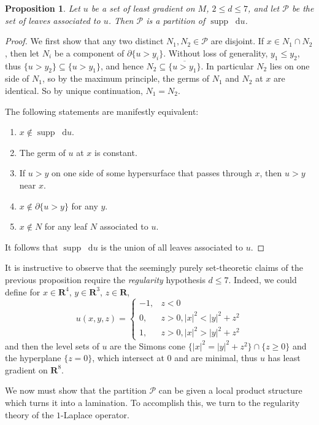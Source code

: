 \documentclass[reqno,10pt]{amsart}
\newcommand{\RR}{\mathbf{R}}
\DeclareMathOperator{\supp}{supp}
\newcommand*\dif{\mathop{}\!\mathrm{d}}
\newtheorem{proposition}[theorem]{Proposition}
\theoremstyle{definition}
\numberwithin{equation}{section}
\begin{document}
\begin{proposition}
Let $u$ be a set of least gradient on $M$, $2 \leq d \leq 7$, and let $\mathscr P$ be the set of leaves associated to $u$.
Then $\mathscr P$ is a partition of $\supp \dif u$.
\end{proposition}
\begin{proof}
We first show that any two distinct $N_1, N_2 \in \mathscr P$ are disjoint.
If $x \in N_1 \cap N_2$, then let $N_i$ be a component of $\partial \{u > y_i\}$.
Without loss of generality, $y_1 \leq y_2$, thus $\{u > y_2\} \subseteq \{u > y_1\}$, and hence $N_2 \subseteq \overline{\{u > y_1\}}$.
In particular $N_2$ lies on one side of $N_1$, so by the maximum principle, the germs of $N_1$ and $N_2$ at $x$ are identical.
So by unique continuation, $N_1 = N_2$.

The following statements are manifestly equivalent:
\begin{enumerate}
\item $x \notin \supp \dif u$.
\item The germ of $u$ at $x$ is constant.
\item If $u > y$ on one side of some hypersurface that passes through $x$, then $u > y$ near $x$.
\item $x \notin \partial \{u > y\}$ for any $y$.
\item $x \notin N$ for any leaf $N$ associated to $u$.
\end{enumerate}
It follows that $\supp \dif u$ is the union of all leaves associated to $u$.
\end{proof}

It is instructive to observe that the seemingly purely set-theoretic claims of the previous proposition require the \emph{regularity} hypothesis $d \leq 7$.
Indeed, we could define for $x \in \RR^4$, $y \in \RR^3$, $z \in \RR$,
$$u(x, y, z) = \begin{cases}
-1, & z < 0 \\
0, & z > 0, |x|^2 < |y|^2 + z^2 \\
1, & z > 0, |x|^2 > |y|^2 + z^2
\end{cases}$$
and then the level sets of $u$ are the Simons cone $\{|x|^2 = |y|^2 + z^2\} \cap \{z \geq 0\}$ and the hyperplane $\{z = 0\}$, which intersect at $0$ and are minimal, thus $u$ has least gradient on $\RR^8$.

We now must show that the partition $\mathscr P$ can be given a local product structure which turns it into a lamination.
To accomplish this, we turn to the regularity theory of the $1$-Laplace operator.
\end{document}
